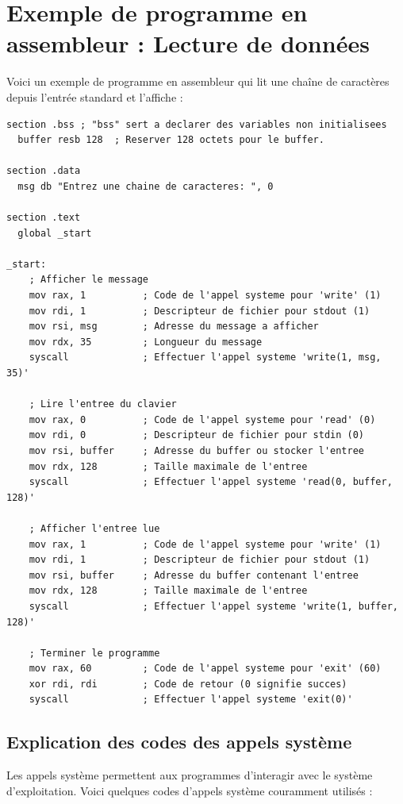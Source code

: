 \documentclass[a4paper, 12pt]{report}
\begin{document}
\break\section{Exemple de programme en assembleur : Lecture de données}
Voici un exemple de programme en assembleur qui lit une chaîne de caractères depuis l'entrée standard et l'affiche :

\begin{lstlisting}[language={[x86masm]Assembler}]
section .bss ; "bss" sert a declarer des variables non initialisees
  buffer resb 128  ; Reserver 128 octets pour le buffer.

section .data
  msg db "Entrez une chaine de caracteres: ", 0

section .text
  global _start

_start:
    ; Afficher le message
    mov rax, 1          ; Code de l'appel systeme pour 'write' (1)
    mov rdi, 1          ; Descripteur de fichier pour stdout (1)
    mov rsi, msg        ; Adresse du message a afficher
    mov rdx, 35         ; Longueur du message
    syscall             ; Effectuer l'appel systeme 'write(1, msg, 35)'

    ; Lire l'entree du clavier
    mov rax, 0          ; Code de l'appel systeme pour 'read' (0)
    mov rdi, 0          ; Descripteur de fichier pour stdin (0)
    mov rsi, buffer     ; Adresse du buffer ou stocker l'entree
    mov rdx, 128        ; Taille maximale de l'entree
    syscall             ; Effectuer l'appel systeme 'read(0, buffer, 128)'

    ; Afficher l'entree lue
    mov rax, 1          ; Code de l'appel systeme pour 'write' (1)
    mov rdi, 1          ; Descripteur de fichier pour stdout (1)
    mov rsi, buffer     ; Adresse du buffer contenant l'entree
    mov rdx, 128        ; Taille maximale de l'entree
    syscall             ; Effectuer l'appel systeme 'write(1, buffer, 128)'

    ; Terminer le programme
    mov rax, 60         ; Code de l'appel systeme pour 'exit' (60)
    xor rdi, rdi        ; Code de retour (0 signifie succes)
    syscall             ; Effectuer l'appel systeme 'exit(0)'
\end{lstlisting}

\subsection{Explication des codes des appels système}
Les appels système permettent aux programmes d'interagir avec le système d'exploitation. Voici quelques codes d'appels système couramment utilisés :
\end{document}
